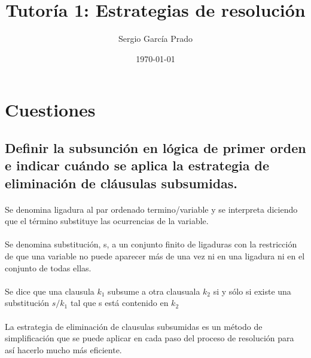 \documentclass[10pt, a4paper,spanish]{article}
\title{\vspace{-15mm}\fontsize{24pt}{10pt}\selectfont\textbf{Tutoría 1: Estrategias de resolución}} %
\author{Sergio García Prado}
\date{\today}
\begin{document}
	\maketitle %

	\thispagestyle{fancy} %



	\section{Cuestiones}


		\subsection{Definir la subsunción en lógica de primer orden e indicar cuándo se aplica la estrategia de eliminación de cláusulas subsumidas.}

			\paragraph{}
			Se denomina ligadura al par ordenado termino/variable y se interpreta diciendo que el término substituye las ocurrencias de la variable.

			\paragraph{}
			Se denomina substitución, s, a un conjunto finito de ligaduras con la restricción de que una variable no puede aparecer más de una vez ni en una ligadura ni en el conjunto de todas ellas.

			\paragraph{}
			Se dice que una clausula $k_1$  subsume a otra clausuala $k_2$ si y sólo si existe una substitución $s/k_1$ tal que s está contenido en $k_2$

			\paragraph{}
			La estrategia de eliminación de clausulas subsumidas es un método de simplificación que se puede aplicar en cada paso del proceso de resolución para así hacerlo mucho más eficiente.
\end{document}
